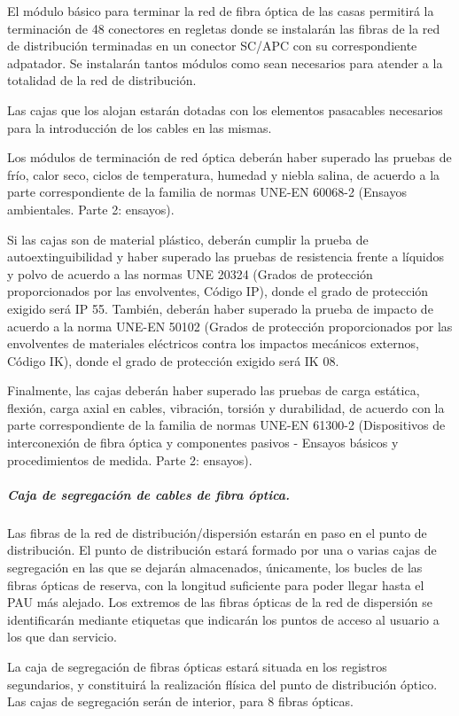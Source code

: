 El módulo básico para terminar la red de fibra óptica de las casas permitirá la terminación de 48 conectores en regletas donde se instalarán las fibras de la red de distribución terminadas en un conector SC/APC con su correspondiente adpatador. Se instalarán tantos módulos como sean necesarios para atender a la totalidad de la red de distribución.

Las cajas que los alojan estarán dotadas con los elementos pasacables necesarios para la introducción de los cables en las mismas.

Los módulos de terminación de red óptica deberán haber superado las pruebas de frío, calor seco, ciclos de temperatura, humedad y niebla salina, de acuerdo a la parte correspondiente de la familia de normas UNE-EN 60068-2 (Ensayos ambientales. Parte 2: ensayos).

Si las cajas son de material plástico, deberán cumplir la prueba de autoextinguibilidad y haber superado las pruebas de resistencia frente a líquidos y polvo de acuerdo a las normas UNE 20324 (Grados de protección proporcionados por las envolventes, Código IP), donde el grado de protección exigido será IP 55. También, deberán haber superado la prueba de impacto de acuerdo a la norma UNE-EN 50102 (Grados de protección proporcionados por las envolventes de materiales eléctricos contra los impactos mecánicos externos, Código IK), donde el grado de protección exigido será IK 08.

Finalmente, las cajas deberán haber superado las pruebas de carga estática, flexión, carga axial en cables, vibración, torsión y durabilidad, de acuerdo con la parte correspondiente de la familia de normas UNE-EN 61300-2 (Dispositivos de interconexión de fibra óptica y componentes pasivos - Ensayos básicos y procedimientos de medida. Parte 2: ensayos).

\subparagraph{Caja de segregación de cables de fibra óptica.}
Las fibras de la red de distribución/dispersión estarán en paso en el punto de distribución. El punto de distribución estará formado por una o varias cajas de segregación en las que se dejarán almacenados, únicamente, los bucles de las fibras ópticas de reserva, con la longitud suficiente para poder llegar hasta el PAU más alejado. Los extremos de las fibras ópticas de la red de dispersión se identificarán mediante etiquetas que indicarán los puntos de acceso al usuario a los que dan servicio.

La caja de segregación de fibras ópticas estará situada en los registros segundarios, y constituirá la realización flísica del punto de distribución óptico. Las cajas de segregación serán de interior, para 8 fibras ópticas.

